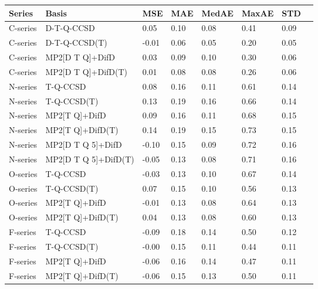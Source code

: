 

\begin{table}
    \begin{tabular}{l l l l l l l l }
      \toprule
      \textbf{Series} & \textbf{Basis}  & \textbf{MSE} & \textbf{MAE} & \textbf{MedAE} & \textbf{MaxAE} & \textbf{STD} \\ 
      \midrule
      C-series & D-T-Q-CCSD & 0.05 & 0.10 & 0.08 & 0.41 & 0.09 \\ 
      C-series & D-T-Q-CCSD(T) & -0.01 & 0.06 & 0.05 & 0.20 & 0.05 \\ 
      C-series & MP2[D T Q]+DifD & 0.03 & 0.09 & 0.10 & 0.30 & 0.06 \\ 
      C-series & MP2[D T Q]+DifD(T) & 0.01 & 0.08 & 0.08 & 0.26 & 0.06 \\ 
      \midrule
        N-series & T-Q-CCSD & 0.08 & 0.16 & 0.11 & 0.61 & 0.14 \\ 
        N-series & T-Q-CCSD(T) & 0.13 & 0.19 & 0.16 & 0.66 & 0.14 \\ 
        N-series & MP2[T Q]+DifD & 0.09 & 0.16 & 0.11 & 0.68 & 0.15 \\ 
        N-series & MP2[T Q]+DifD(T) & 0.14 & 0.19 & 0.15 & 0.73 & 0.15 \\ 
        N-series & MP2[D T Q 5]+DifD & -0.10 & 0.15 & 0.09 & 0.72 & 0.16 \\ 
        N-series & MP2[D T Q 5]+DifD(T) & -0.05 & 0.13 & 0.08 & 0.71 & 0.16 \\ 
        \midrule
    O-series & T-Q-CCSD & -0.03 & 0.13 & 0.10 & 0.67 & 0.14 \\ 
    O-series & T-Q-CCSD(T) & 0.07 & 0.15 & 0.10 & 0.56 & 0.13 \\ 
    O-series & MP2[T Q]+DifD & -0.01 & 0.13 & 0.08 & 0.64 & 0.13 \\ 
    O-series & MP2[T Q]+DifD(T) & 0.04 & 0.13 & 0.08 & 0.60 & 0.13 \\ 
    \midrule
    F-series & T-Q-CCSD & -0.09 & 0.18 & 0.14 & 0.50 & 0.12 \\ 
    F-series & T-Q-CCSD(T) & -0.00 & 0.15 & 0.11 & 0.44 & 0.11 \\ 
    F-series & MP2[T Q]+DifD & -0.06 & 0.16 & 0.14 & 0.47 & 0.11 \\ 
    F-series & MP2[T Q]+DifD(T) & -0.06 & 0.15 & 0.13 & 0.50 & 0.11 \\ 
      \bottomrule
    \end{tabular}
  \end{table}